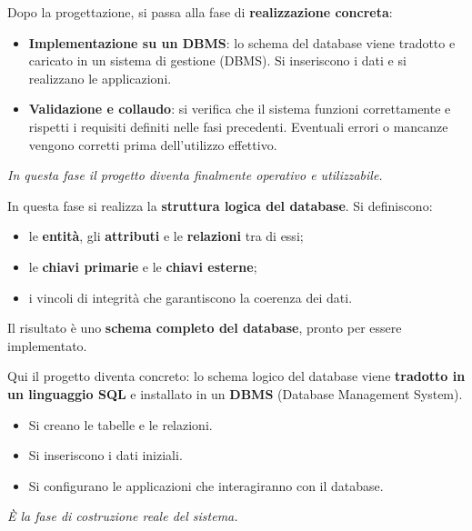 \begin{tcolorbox}[colback=blue!10!white, colframe=blue!70!black, title=\textbf{5. Implementazione e collaudo}]
Dopo la progettazione, si passa alla fase di \textbf{realizzazione concreta}:
\begin{itemize}
    \item \textbf{Implementazione su un DBMS}: lo schema del database viene tradotto e caricato in un sistema di gestione (DBMS).  
    Si inseriscono i dati e si realizzano le applicazioni.
    \item \textbf{Validazione e collaudo}: si verifica che il sistema funzioni correttamente e rispetti i requisiti definiti nelle fasi precedenti.  
    Eventuali errori o mancanze vengono corretti prima dell’utilizzo effettivo.
\end{itemize}
\textit{In questa fase il progetto diventa finalmente operativo e utilizzabile.}
\end{tcolorbox}
\begin{tcolorbox}[colback=cyan!10!white, colframe=cyan!70!black, title=\textbf{6. Progettazione dei dati}]
In questa fase si realizza la \textbf{struttura logica del database}.  
Si definiscono:
\begin{itemize}
    \item le \textbf{entità}, gli \textbf{attributi} e le \textbf{relazioni} tra di essi;
    \item le \textbf{chiavi primarie} e le \textbf{chiavi esterne};
    \item i vincoli di integrità che garantiscono la coerenza dei dati.
\end{itemize}
Il risultato è uno \textbf{schema completo del database}, pronto per essere implementato.
\end{tcolorbox}

\begin{tcolorbox}[colback=teal!10!white, colframe=teal!70!black, title=\textbf{7. Implementazione su un DBMS}]
Qui il progetto diventa concreto:  
lo schema logico del database viene \textbf{tradotto in un linguaggio SQL} e installato in un \textbf{DBMS} (Database Management System).  
\begin{itemize}
    \item Si creano le tabelle e le relazioni.  
    \item Si inseriscono i dati iniziali.  
    \item Si configurano le applicazioni che interagiranno con il database.
\end{itemize}
\textit{È la fase di costruzione reale del sistema.}
\end{tcolorbox}

